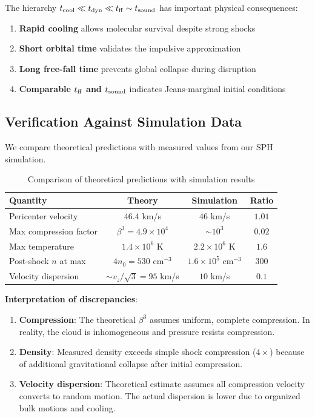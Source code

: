 \documentclass[twocolumn,amsmath,amssymb,prd,superscriptaddress,nofootinbib]{revtex4-2}
\begin{document}
The hierarchy $t_{\rm cool} \ll t_{\rm dyn} \ll t_{\rm ff} \sim t_{\rm sound}$ has important physical consequences:
\begin{enumerate}
    \item \textbf{Rapid cooling} allows molecular survival despite strong shocks
    \item \textbf{Short orbital time} validates the impulsive approximation
    \item \textbf{Long free-fall time} prevents global collapse during disruption
    \item \textbf{Comparable $t_{\rm ff}$ and $t_{\rm sound}$} indicates Jeans-marginal initial conditions
\end{enumerate}

\subsection{Verification Against Simulation Data}
\label{sec:verification}

We compare theoretical predictions with measured values from our SPH simulation.

\begin{table}[h]
\centering
\caption{Comparison of theoretical predictions with simulation results}
\label{tab:verification}
\begin{tabular}{lccc}
\toprule
Quantity & Theory & Simulation & Ratio \\
\midrule
Pericenter velocity & $46.4$ km/s & $46$ km/s & $1.01$ \\
Max compression factor & $\beta^3 = 4.9 \times 10^4$ & $\sim 10^3$ & $0.02$ \\
Max temperature & $1.4 \times 10^6$ K & $2.2 \times 10^6$ K & $1.6$ \\
Post-shock $n$ at max & $4 n_0 = 530$ cm$^{-3}$ & $1.6 \times 10^5$ cm$^{-3}$ & $300$ \\
Velocity dispersion & $\sim v_z/\sqrt{3} = 95$ km/s & $10$ km/s & $0.1$ \\
\bottomrule
\end{tabular}
\end{table}

\textbf{Interpretation of discrepancies}:
\begin{enumerate}
    \item \textbf{Compression}: The theoretical $\beta^3$ assumes uniform, complete compression. In reality, the cloud is inhomogeneous and pressure resists compression.

    \item \textbf{Density}: Measured density exceeds simple shock compression ($4\times$) because of additional gravitational collapse after initial compression.

    \item \textbf{Velocity dispersion}: Theoretical estimate assumes all compression velocity converts to random motion. The actual dispersion is lower due to organized bulk motions and cooling.
\end{enumerate}
\end{document}
